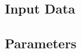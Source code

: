 \documentclass[TechnicalNoteMeteo.tex]{subfiles}
\begin{document}
\subsection{Input Data}

\subsection{Parameters}
\end{document}
